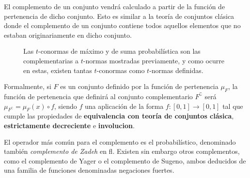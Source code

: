 El complemento de un conjunto vendrá calculado a partir de la función de pertenencia de dicho conjunto. Esto es similar a la teoría de conjuntos clásica donde el complemento de un conjunto contiene todos aquellos elementos que no estaban originariamente en dicho conjunto.

\begin{figure}[t]
	\centering
	\qquad
	\caption[$t$-normas del máximo y de la suma algebraica]{Las $t$-conormas de máximo y de suma probabilística son las complementarias a $t$-normas mostradas previamente, y como ocurre en estas, existen tantas $t$-conormas como $t$-normas definidas.}
	\label{fig:t-conorms}
\end{figure}

Formalmente, si $F$ es un conjunto definido por la función de pertenencia $\mu_F$, la función de pertenencia que definirá al conjunto complementario $F^\complement$ será $\mu_{F^\complement} = \mu_F(x) \circ f$, siendo $f$ una aplicación de la forma $f : [0,1] \rightarrow [0,1]$ tal que cumple las propiedades de \textbf{equivalencia con teoría de conjuntos clásica}, \textbf{estrictamente decreciente} e \textbf{involucion}.

El operador más común para el complemento es el probabilístico, denominado también \textit{complemento de Zadeh} en \ac{fl}. Existen sin embargo otros complementos, como el complemento de Yager o el complemento de Sugeno, ambos deducidos de una familia de funciones denominadas negaciones fuertes.

